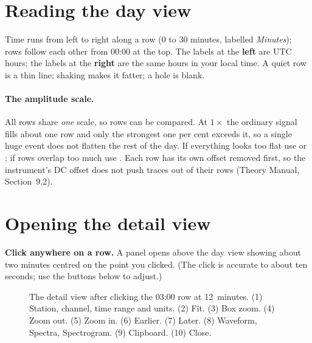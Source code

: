 \section{Reading the day view}
Time runs from left to right along a row (0 to 30 minutes, labelled \emph{Minutes}); rows follow each other from 00:00
at the top. The labels at the \textbf{left} are UTC hours; the labels at the \textbf{right} are the same hours in your local time. A quiet
row is a thin line; shaking makes it fatter; a hole is blank.

\paragraph{The amplitude scale.} All rows share \emph{one} scale, so rows can be compared. At $1\times$ the ordinary signal fills about
one row and only the strongest one per cent exceeds it, so a single huge event does not flatten the rest of the day. If everything
looks too flat use  or ; if rows overlap too much use . Each row has its own offset removed first, so the
instrument's DC offset does not push traces out of their rows (Theory Manual, Section~9.2).

\section{Opening the detail view}
\textbf{Click anywhere on a row.} A panel opens above the day view showing about two minutes centred on the point you clicked.
(The click is accurate to about ten seconds; use the buttons below to adjust.)

\begin{figure}[tbp]
\centering
{}
\caption{The detail view after clicking the 03:00 row at 12~minutes. (1) Station, channel, time range and units. (2) Fit.
(3) Box zoom. (4) Zoom out. (5) Zoom in. (6) Earlier. (7) Later. (8) Waveform, Spectra, Spectrogram. (9) Clipboard. (10) Close.}\label{fig:heli}
\end{figure}

